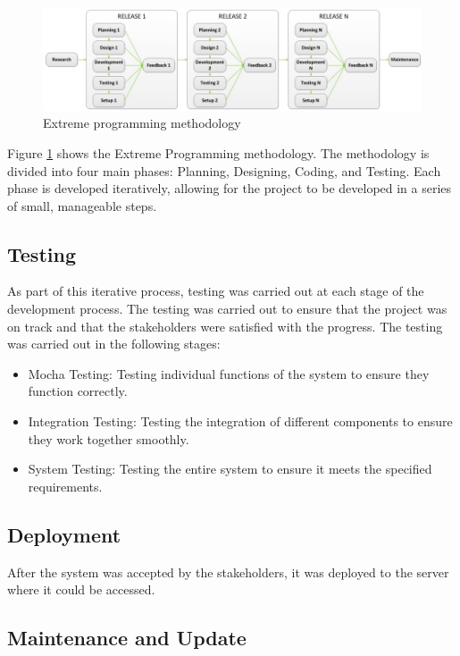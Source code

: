 \begin{figure}
    \centering
    \includegraphics[width=1.0\linewidth]{images/xp.png}
    \caption{Extreme programming methodology \cite{despa2014comparative}}
    \label{fig:agile}
\end{figure}

Figure \ref{fig:agile} shows the Extreme Programming methodology. The methodology is divided into four main phases: Planning, Designing, Coding, and Testing. 
Each phase is developed iteratively, allowing for the project to be developed in a series of small, manageable steps. 

\subsection{Testing}
As part of this iterative process, testing was carried out at each stage of the development process. The testing was carried out to ensure that the project 
was on track and that the stakeholders were satisfied with the progress. The testing was carried out in the following stages:

\begin{itemize}
    \item Mocha Testing: Testing individual functions of the system to ensure they function correctly.
    \item Integration Testing: Testing the integration of different components to ensure they work together smoothly.
    \item System Testing: Testing the entire system to ensure it meets the specified requirements.
\end{itemize}
    

\subsection{Deployment}

After the system was accepted by the stakeholders, it was deployed to the server where it could be accessed. 

\subsection{Maintenance and Update}

